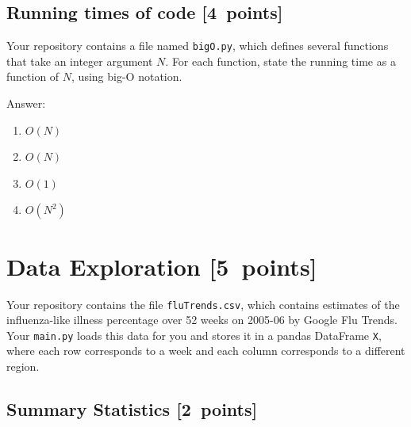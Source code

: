 \documentclass{article}
\newcommand{\blu}[1]{{\textcolor{blu}{#1}}}
\newenvironment{answer}{\par\begingroup\color{gre}Answer: }{\endgroup}
\let\ask\blu
\newcommand\pts[1]{\textcolor{pointscolour}{[#1~points]}}
\begin{document}
  \subsection{Running times of code \pts{4}}

  Your repository contains a file named \texttt{bigO.py}, which defines several functions
  that take an integer argument $N$. For each function, \ask{state the running time as a function of $N$, using big-O notation}.
  \begin{answer}
    \begin{enumerate}
      \item $O(N)$
      \item $O(N)$
      \item $O(1)$
      \item $O(N^2)$
    \end{enumerate}
  \end{answer}

  \section{Data Exploration \pts{5}}


  Your repository contains the file \texttt{fluTrends.csv}, which contains estimates
  of the influenza-like illness percentage over 52 weeks on 2005-06 by Google Flu Trends.
  Your \texttt{main.py} loads this data for you and stores it in a pandas DataFrame \texttt{X},
  where each row corresponds to a week and each column
  corresponds to a different
  region.

  \subsection{Summary Statistics \pts{2}}
\end{document}
